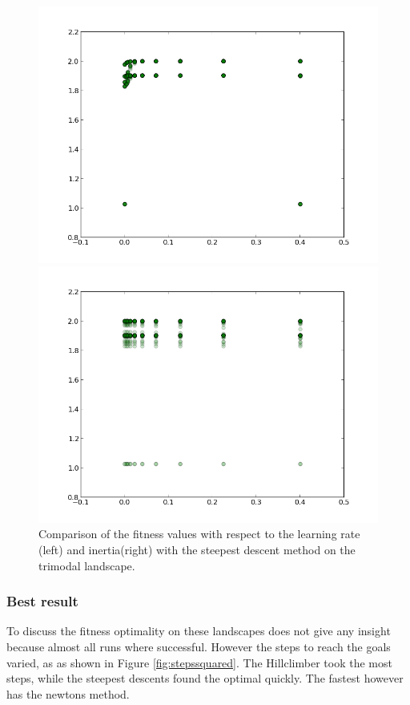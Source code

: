 \documentclass{scrartcl}
\begin{document}
\begin{figure}[H]
\centering
\begin{minipage}{.5\textwidth}
  \centering
  \includegraphics[width=.8\linewidth]{img/ex1/learning_trimodal_ss.png}
\end{minipage}%
\begin{minipage}{.5\textwidth}
  \centering
  \includegraphics[width=.8\linewidth]{img/ex1/inertia_trimodal_ss.png}
\end{minipage}
\caption{Comparison of the fitness values with respect to the learning rate (left) and inertia(right) with the steepest descent method on the trimodal landscape.}
\label{fig:inertialearning}
\end{figure}

\subsubsection{Best result}
To discuss the fitness optimality on these landscapes does not give any insight because almost all runs where successful. However the steps to reach the goals varied, as as shown in Figure \ref{fig:stepssquared}. The Hillclimber took the most steps, while the steepest descents found the optimal quickly. The fastest however has the newtons method.
\end{document}
